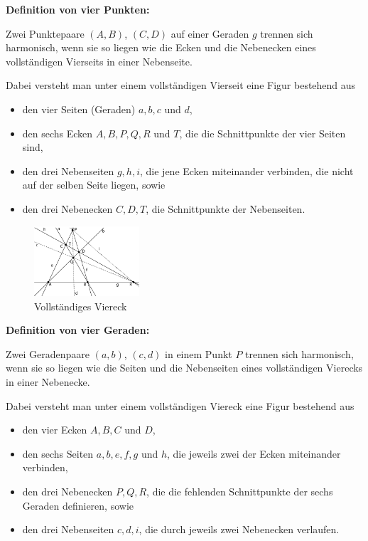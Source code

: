 \documentclass[12pt,a4paper]{article}
\begin{document}
\textbf{Definition von vier Punkten:}

Zwei Punktepaare $(A,B)$, $(C,D)$ auf einer Geraden $g$ \glqq trennen sich harmonisch\grqq , wenn sie so liegen wie die Ecken und die Nebenecken eines vollständigen Vierseits in einer Nebenseite.

Dabei versteht man unter einem vollständigen Vierseit eine Figur bestehend aus

\begin{itemize}
\item den vier Seiten (Geraden) $a, b, c$ und $d$,
\item den sechs Ecken $A, B, P, Q, R$ und $T$, die die Schnittpunkte der vier Seiten sind,
\item den drei Nebenseiten $g, h, i$, die jene Ecken miteinander verbinden, die nicht auf der selben Seite liegen, sowie
\item den drei Nebenecken $C, D, T$, die Schnittpunkte der Nebenseiten.
\end{itemize}

\begin{figure}
\centering
\includegraphics[width=0.35\textwidth]{Bilder/vollstaendigesViereck.png}
\caption{Vollständiges Viereck}
\end{figure}

\textbf{Definition von vier Geraden:}

Zwei Geradenpaare $(a,b)$, $(c,d)$ in einem Punkt $P$ \glqq trennen sich harmonisch\grqq , wenn sie so liegen wie die Seiten und die Nebenseiten eines vollständigen Vierecks in einer Nebenecke.

Dabei versteht man unter einem vollständigen Viereck eine Figur bestehend aus


\begin{itemize}
\item den vier Ecken $A, B, C$ und $D$,
\item den sechs Seiten $a, b, e, f, g$ und $h$, die jeweils zwei der Ecken miteinander verbinden,
\item den drei Nebenecken $P, Q, R$, die die fehlenden Schnittpunkte der sechs Geraden definieren, sowie
\item den drei Nebenseiten $c, d, i$, die durch jeweils zwei Nebenecken verlaufen.
\end{itemize}
\end{document}
